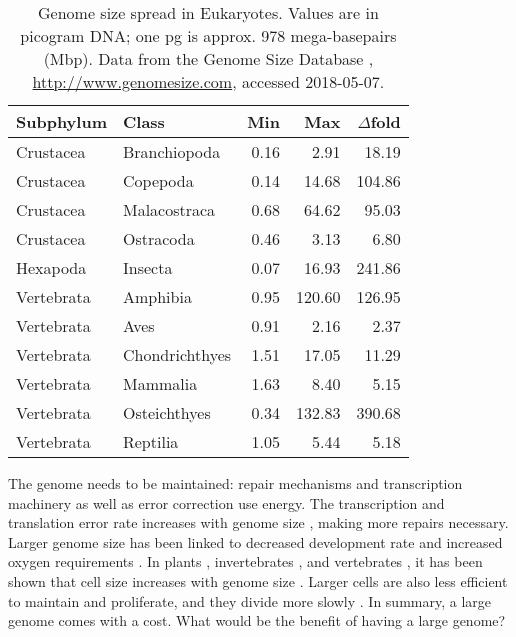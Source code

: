 \begin{table}
\centering\footnotesize
\caption[Genome size spread in Eukaryotes]{Genome size spread in
Eukaryotes. Values are in picogram DNA; one pg is approx. 978
mega-basepairs (Mbp). Data from the Genome Size Database
\citep{Gregory2018}, \url{http://www.genomesize.com}, accessed
2018-05-07.}
\label{tab:genome-size-spread}
\begin{tabular}{@{}llrrr@{}}
\toprule
Subphylum  & Class              & Min  & Max    & $\Delta$fold  \\
\midrule
Crustacea  & Branchiopoda       & 0.16 &   2.91 &  18.19        \\
Crustacea  & Copepoda           & 0.14 &  14.68 & 104.86        \\
Crustacea  & Malacostraca       & 0.68 &  64.62 &  95.03        \\
Crustacea  & Ostracoda          & 0.46 &   3.13 &   6.80        \\
Hexapoda   & Insecta            & 0.07 &  16.93 & 241.86        \\
Vertebrata & Amphibia           & 0.95 & 120.60 & 126.95        \\
Vertebrata & Aves               & 0.91 &   2.16 &   2.37        \\
Vertebrata & Chondrichthyes     & 1.51 &  17.05 &  11.29        \\
Vertebrata & Mammalia           & 1.63 &   8.40 &   5.15        \\
Vertebrata & Osteichthyes       & 0.34 & 132.83 & 390.68        \\
Vertebrata & Reptilia           & 1.05 &   5.44 &   5.18        \\
\bottomrule
\end{tabular}
\end{table}

The genome needs to be maintained: repair mechanisms and transcription
machinery as well as error correction use energy. The transcription and
translation error rate increases with genome size \citep{Zaher2009},
making more repairs necessary. Larger genome size has been linked to
decreased development rate \citep{White2000} and increased oxygen
requirements \citep{Vinogradov1997, Gregory2002}. In plants
\citep{Grime1983}, invertebrates \citep{Gregory2005}, and vertebrates
\citep{Horner1983, Olmo1982, Gregory2000}, it has been shown that cell
size increases with genome size \citep{Dufresne2011}. Larger cells are
also less efficient to maintain and proliferate, and they divide more
slowly \citep{Bennett1977}. In summary, a large genome comes with a
cost. What would be the benefit of having a large genome?

